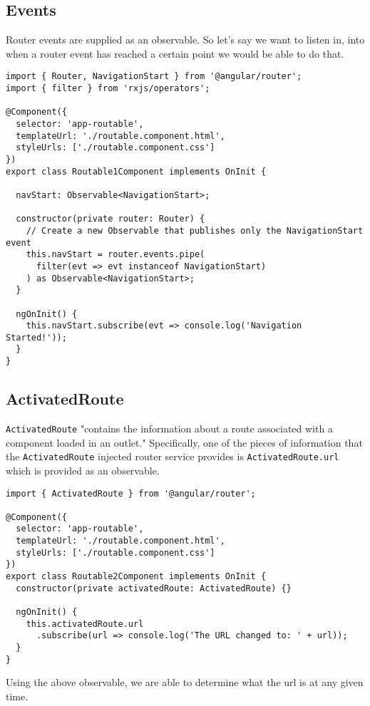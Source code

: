 \subsection{Events}
Router events are supplied as an observable. So let's say we want to listen 
in, into when a router event has reached a certain point we would be able to 
do that. 
\begin{lstlisting}
import { Router, NavigationStart } from '@angular/router';
import { filter } from 'rxjs/operators';

@Component({
  selector: 'app-routable',
  templateUrl: './routable.component.html',
  styleUrls: ['./routable.component.css']
})
export class Routable1Component implements OnInit {

  navStart: Observable<NavigationStart>;

  constructor(private router: Router) {
    // Create a new Observable that publishes only the NavigationStart event
    this.navStart = router.events.pipe(
      filter(evt => evt instanceof NavigationStart)
    ) as Observable<NavigationStart>;
  }

  ngOnInit() {
    this.navStart.subscribe(evt => console.log('Navigation Started!'));
  }
}
\end{lstlisting}

\subsection{ ActivatedRoute }
\lstinline{ActivatedRoute} "contains the information about a route associated
with a component loaded in an outlet." Specifically, one of the pieces of 
information that the \lstinline{ActivatedRoute} injected router service 
provides is \lstinline{ActivatedRoute.url} which is provided as an observable. 

\begin{lstlisting}
import { ActivatedRoute } from '@angular/router';

@Component({
  selector: 'app-routable',
  templateUrl: './routable.component.html',
  styleUrls: ['./routable.component.css']
})
export class Routable2Component implements OnInit {
  constructor(private activatedRoute: ActivatedRoute) {}

  ngOnInit() {
    this.activatedRoute.url
      .subscribe(url => console.log('The URL changed to: ' + url));
  }
}
\end{lstlisting}
Using the above observable, we are able to determine what the url is at any
given time. 

